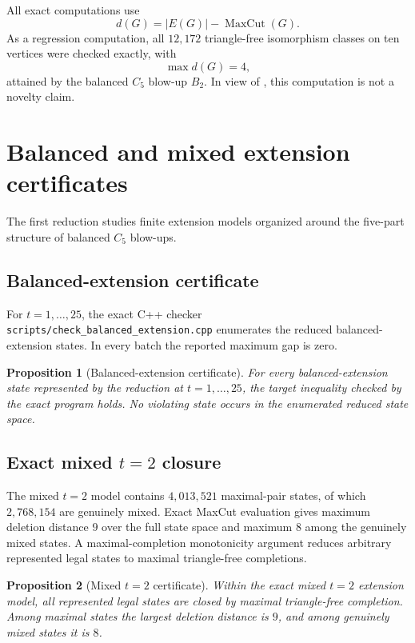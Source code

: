 \documentclass[11pt]{article}
\newtheorem{proposition}{Proposition}
\newcommand{\mc}{\operatorname{MaxCut}}
\newcommand{\dd}{d}
\begin{document}
All exact computations use
\[
\dd(G)=|E(G)|-\mc(G).
\]
As a regression computation, all $12{,}172$ triangle-free isomorphism
classes on ten vertices were checked exactly, with
\[
\max \dd(G)=4,
\]
attained by the balanced $C_5$ blow-up $B_2$.  In view of
\cite{Ferudun}, this computation is not a novelty claim.

\section{Balanced and mixed extension certificates}

The first reduction studies finite extension models organized around the
five-part structure of balanced $C_5$ blow-ups.

\subsection{Balanced-extension certificate}

For $t=1,\ldots,25$, the exact C++ checker
\texttt{scripts/check\_balanced\_extension.cpp} enumerates the reduced
balanced-extension states.  In every batch the reported maximum gap is
zero.

\begin{proposition}[Balanced-extension certificate]
For every balanced-extension state represented by the reduction at
$t=1,\ldots,25$, the target inequality checked by the exact program holds.
No violating state occurs in the enumerated reduced state space.
\end{proposition}

\subsection{Exact mixed $t=2$ closure}

The mixed $t=2$ model contains $4{,}013{,}521$ maximal-pair states, of
which $2{,}768{,}154$ are genuinely mixed.  Exact MaxCut evaluation gives
maximum deletion distance $9$ over the full state space and maximum $8$
among the genuinely mixed states.  A maximal-completion monotonicity
argument reduces arbitrary represented legal states to maximal
triangle-free completions.

\begin{proposition}[Mixed $t=2$ certificate]
Within the exact mixed $t=2$ extension model, all represented legal states
are closed by maximal triangle-free completion.  Among maximal states the
largest deletion distance is $9$, and among genuinely mixed states it is
$8$.
\end{proposition}
\end{document}
